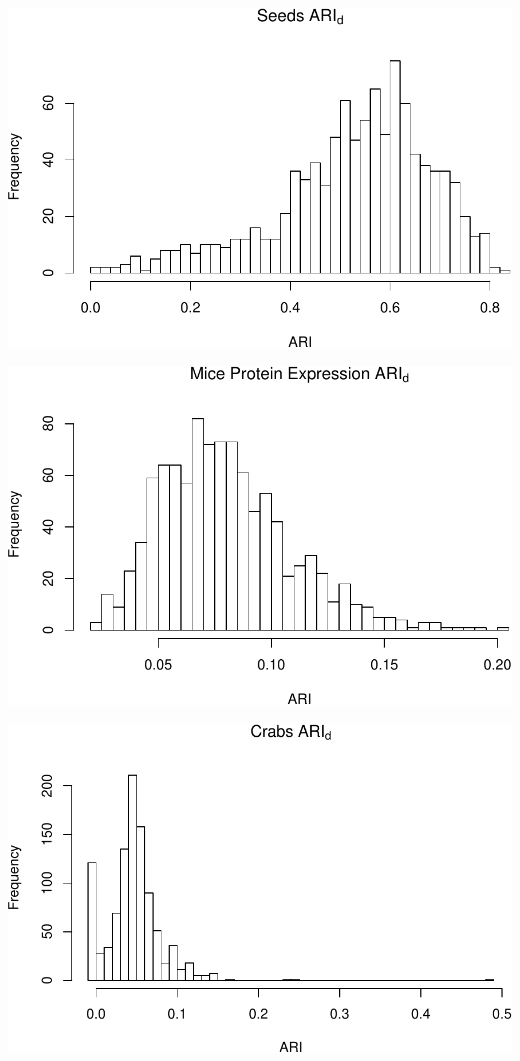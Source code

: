 \begin{center}\includegraphics[width=1\linewidth]{Report_files/figure-latex/unnamed-chunk-18-5} \end{center}

\begin{center}\includegraphics[width=1\linewidth]{Report_files/figure-latex/unnamed-chunk-18-6} \end{center}

\begin{center}\includegraphics[width=1\linewidth]{Report_files/figure-latex/unnamed-chunk-18-7} \end{center}



